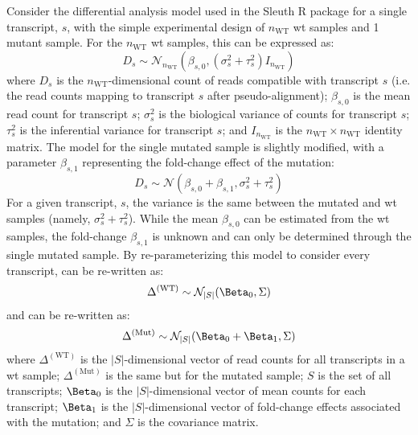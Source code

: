Consider the differential analysis model used in the Sleuth R package \cite{pimentelDifferentialAnalysisRNAseq2017,yiGenelevelDifferentialAnalysis2018} for a single transcript, $s$, with the simple experimental design of $n_\mathrm{WT}$ \gls{wt} samples and 1 mutant sample.
For the $n_\mathrm{WT}$ \gls{wt} samples, this can be expressed as:
%
\begin{equation}
  D_s \sim \mathcal{N}_{n_\mathrm{WT}} \left( \beta_{s,0}, (\sigma_s^2 + \tau_s^2)I_{n_\mathrm{WT}} \right)
  \label{eqn:wt_model}
\end{equation}
%
where $D_s$ is the $n_\mathrm{WT}$-dimensional count of reads compatible with transcript $s$ (i.e. the read counts mapping to transcript $s$ after pseudo-alignment); $\beta_{s,0}$ is the mean read count for transcript $s$; $\sigma_s^2$ is the biological variance of counts for transcript $s$; $\tau_s^2$ is the inferential variance for transcript $s$; and $I_{n_\mathrm{WT}}$ is the ${n_\mathrm{WT}} \times {n_\mathrm{WT}}$ identity matrix.
The model for the single mutated sample is slightly modified, with a parameter $\beta_{s,1}$ representing the fold-change effect of the mutation:
%
\begin{equation}
  D_s \sim \mathcal{N} \left( \beta_{s, 0} + \beta_{s, 1}, \sigma_s^2 + \tau_s^2 \right)
  \label{eqn:single_mut_model}
\end{equation}
%
For a given transcript, $s$, the variance is the same between the mutated and \gls{wt} samples (namely, $\sigma_s^2 + \tau_s^2$).
While the mean $\beta_{s, 0}$ can be estimated from the \gls{wt} samples, the fold-change $\beta_{s, 1}$ is unknown and can only be determined through the single mutated sample.
By re-parameterizing this model to consider every transcript,  can be re-written as:
%
\begin{equation}
  \Delta^{(\mathrm{WT})} \sim \mathcal{N}_{|S|}(\Beta_0, \Sigma) \\
  \label{eqn:delta_wt}
\end{equation}
%
and  can be re-written as:
%
\begin{equation}
  \Delta^{(\mathrm{Mut})} \sim \mathcal{N}_{|S|}(\Beta_0 + \Beta_1, \Sigma) \\
  \label{eqn:delta_mut}
\end{equation}
%
where $\Delta^{(\mathrm{WT})}$ is the $|S|$-dimensional vector of read counts for all transcripts in a \gls{wt} sample; $\Delta^{(\mathrm{Mut})}$ is the same but for the mutated sample; $S$ is the set of all transcripts; $\Beta_0$ is the $|S|$-dimensional vector of mean counts for each transcript; $\Beta_1$ is the $|S|$-dimensional vector of fold-change effects associated with the mutation; and $\Sigma$ is the covariance matrix.

